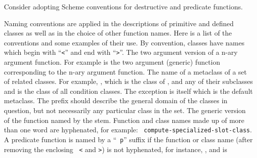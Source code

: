 %
\begin{optPrivate}
    Consider adopting Scheme conventions for destructive and predicate
    functions.
\end{optPrivate}
%
\begin{optDefinition}
Naming conventions are applied in the descriptions of primitive and
defined classes as well as in the choice of other function names.
Here is a list of the conventions and some examples of their use.
%
 By convention, classes have names
which begin with ``{\tt <}'' and end with ``{\tt >}''.
%
 The two argument version of a n-ary
argument function.  For example  is the two argument
(generic) function corresponding to the n-ary argument \functionref{+} function.
%
%
 The name of a metaclass of a set of
related classes.  For example, {\tt <function-class>}, which is the class of
{\tt <simple-function>}, {\tt <generic-function>} and any of their subclasses
and {\tt <condition-class>} is the class of all condition classes.  The
exception is  itself which is the default metaclass.  The prefix
should describe the general domain of the classes in question, but not
necessarily any particular class in the set.
%
 The generic version of the function
named by the stem.
%
 Function and class names made up of more than one
word are hyphenated, for example: {\tt
    compute-specialized-slot-class}.
%
%
%
 A predicate function is named by a ``{\tt
    p}'' suffix if the function or class name (after removing the enclosing {\tt
    <} and {\tt >}) is not hyphenated, for instance, , and is

\end{optDefinition}
